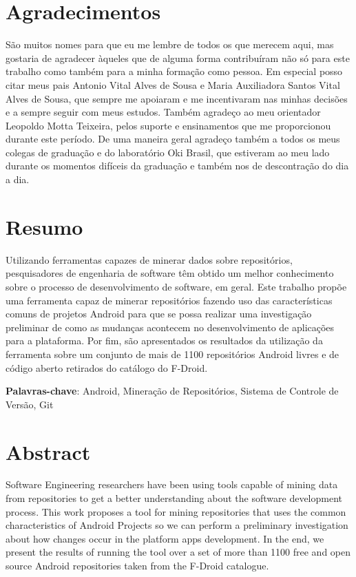 \documentclass[a4paper,12pt]{article}
\begin{document}
\newpage
\section*{Agradecimentos}

São muitos nomes para que eu me lembre de todos os que merecem aqui, mas gostaria de agradecer àqueles que de alguma forma contribuíram não só para este trabalho como também para a minha formação como pessoa. Em especial posso citar meus pais Antonio Vital Alves de Sousa e Maria Auxiliadora Santos Vital Alves de Sousa, que sempre me apoiaram e me incentivaram nas minhas decisões e a sempre seguir com meus estudos. Também agradeço ao meu orientador Leopoldo Motta Teixeira, pelos suporte e ensinamentos que me proporcionou durante este período. De uma maneira geral agradeço também a todos os meus colegas de graduação e do laboratório Oki Brasil, que estiveram ao meu lado durante os momentos difíceis da graduação e também nos de  descontração do dia a dia.

\newpage
{} %
\section*{Resumo}
Utilizando ferramentas capazes de minerar dados sobre repositórios, pesquisadores de engenharia de software têm obtido um melhor conhecimento sobre o processo de desenvolvimento de software, em geral. Este trabalho propõe uma ferramenta capaz de minerar repositórios fazendo uso das características comuns de projetos Android para que se possa realizar uma investigação preliminar de como as mudanças acontecem no desenvolvimento de aplicações para a plataforma. Por fim, são apresentados os resultados da utilização da ferramenta sobre um conjunto de mais de 1100 repositórios Android livres e de código aberto retirados do catálogo do F-Droid. 

\textbf{Palavras-chave}: Android, Mineração de Repositórios, Sistema de Controle de Versão, Git

\newpage
\section*{Abstract}

Software Engineering researchers have been using tools capable of mining data from repositories to get a better understanding about the software development process. This work proposes a tool for mining repositories that uses the common characteristics of Android Projects so we can perform a preliminary investigation about how changes occur in the platform apps development. In the end, we present the results of running the tool over a set of more than 1100 free and open source Android repositories taken from the F-Droid catalogue. 
\end{document}
